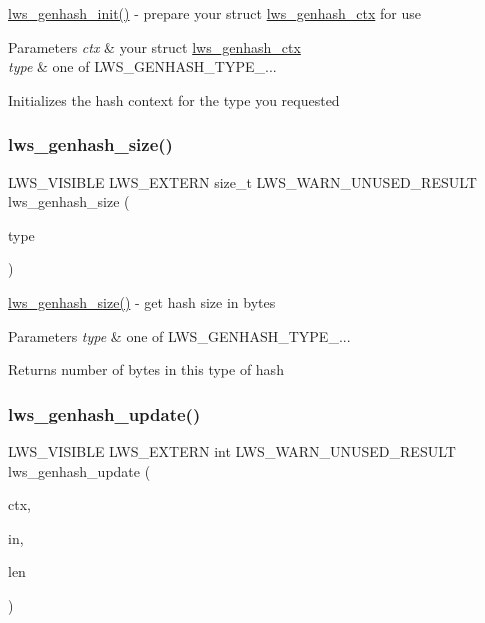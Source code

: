 \hyperlink{group__generic_ga9a5deb937ea81ee82d4a7779af9e7120}{lws\+\_\+genhash\+\_\+init()} -\/ prepare your struct \hyperlink{structlws__genhash__ctx}{lws\+\_\+genhash\+\_\+ctx} for use


\begin{DoxyParams}{Parameters}
{\em ctx} & your struct \hyperlink{structlws__genhash__ctx}{lws\+\_\+genhash\+\_\+ctx} \\
\hline
{\em type} & one of L\+W\+S\+\_\+\+G\+E\+N\+H\+A\+S\+H\+\_\+\+T\+Y\+P\+E\+\_\+...\\
\hline
\end{DoxyParams}
Initializes the hash context for the type you requested \mbox{\label{group__generic_gac8bc5201d6156bec14956919fe4fcaeb}} 
\subsubsection{\texorpdfstring{lws\+\_\+genhash\+\_\+size()}{lws\_genhash\_size()}}
{\footnotesize\ttfamily L\+W\+S\+\_\+\+V\+I\+S\+I\+B\+LE L\+W\+S\+\_\+\+E\+X\+T\+E\+RN size\+\_\+t L\+W\+S\+\_\+\+W\+A\+R\+N\+\_\+\+U\+N\+U\+S\+E\+D\+\_\+\+R\+E\+S\+U\+LT lws\+\_\+genhash\+\_\+size (\begin{DoxyParamCaption}\item[{int}]{type }\end{DoxyParamCaption})}

\hyperlink{group__generic_gac8bc5201d6156bec14956919fe4fcaeb}{lws\+\_\+genhash\+\_\+size()} -\/ get hash size in bytes


\begin{DoxyParams}{Parameters}
{\em type} & one of L\+W\+S\+\_\+\+G\+E\+N\+H\+A\+S\+H\+\_\+\+T\+Y\+P\+E\+\_\+...\\
\hline
\end{DoxyParams}
Returns number of bytes in this type of hash \mbox{\label{group__generic_ga474ee7170e63dd01ef5eaee6036beb78}} 
\subsubsection{\texorpdfstring{lws\+\_\+genhash\+\_\+update()}{lws\_genhash\_update()}}
{\footnotesize\ttfamily L\+W\+S\+\_\+\+V\+I\+S\+I\+B\+LE L\+W\+S\+\_\+\+E\+X\+T\+E\+RN int L\+W\+S\+\_\+\+W\+A\+R\+N\+\_\+\+U\+N\+U\+S\+E\+D\+\_\+\+R\+E\+S\+U\+LT lws\+\_\+genhash\+\_\+update (\begin{DoxyParamCaption}\item[{struct \hyperlink{structlws__genhash__ctx}{lws\+\_\+genhash\+\_\+ctx} $\ast$}]{ctx,  }\item[{const void $\ast$}]{in,  }\item[{size\+\_\+t}]{len }\end{DoxyParamCaption})}

